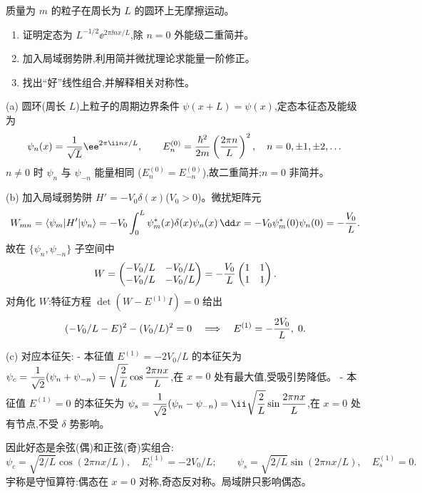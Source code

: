 \begin{question}
质量为 $m$ 的粒子在周长为 $L$ 的圆环上无摩擦运动。
\begin{enumerate}
\item 证明定态为 $L^{-1/2}\ee^{2\pi\ii nx/L}$,除 $n=0$ 外能级二重简并。
\item 加入局域弱势阱,利用简并微扰理论求能量一阶修正。
\item 找出“好”线性组合,并解释相关对称性。
\end{enumerate}
\begin{solution}
(a) 圆环(周长 $L$)上粒子的周期边界条件 $\psi(x+L)=\psi(x)$,定态本征态及能级为
\[
\psi_n(x)={1\over\sqrt L}\ee^{2\pi\ii nx/L},\qquad
E_n^{(0)}={\hbar^2\over2m}\left({2\pi n\over L}\right)^2,\quad n=0,\pm1,\pm2,\dots
\]
$n\ne0$ 时 $\psi_n$ 与 $\psi_{-n}$ 能量相同 ($E_n^{(0)}=E_{-n}^{(0)}$),故二重简并;$n=0$ 非简并。

(b) 加入局域弱势阱 $H'=-V_0\delta(x)$($V_0>0$)。微扰矩阵元
\[
W_{mn}=\langle\psi_m|H'|\psi_n\rangle
=-V_0\int_0^L\psi_m^*(x)\delta(x)\psi_n(x)\,\dd x
=-V_0\psi_m^*(0)\psi_n(0)=-{V_0\over L}.
\]
故在 $\{\psi_n,\psi_{-n}\}$ 子空间中
\[
W=\begin{pmatrix}
-V_0/L & -V_0/L\\
-V_0/L & -V_0/L
\end{pmatrix}
=-{V_0\over L}\begin{pmatrix}1&1\\1&1\end{pmatrix}.
\]
对角化 $W$:特征方程 $\det(W-E^{(1)}I)=0$ 给出
\[
(-V_0/L-E)^2-(V_0/L)^2=0
\quad\Longrightarrow\quad E^{(1)}=-{2V_0\over L},\;0.
\]

(c) 对应本征矢:
- 本征值 $E^{(1)}=-2V_0/L$ 的本征矢为 $\displaystyle\psi_c={1\over\sqrt2}(\psi_n+\psi_{-n})=\sqrt{2\over L}\cos{2\pi nx\over L}$,在 $x=0$ 处有最大值,受吸引势降低。
- 本征值 $E^{(1)}=0$ 的本征矢为 $\displaystyle\psi_s={1\over\sqrt2}(\psi_n-\psi_{-n})=\ii\sqrt{2\over L}\sin{2\pi nx\over L}$,在 $x=0$ 处有节点,不受 $\delta$ 势影响。

因此好态是余弦(偶)和正弦(奇)实组合:
\[
\boxed{\psi_c=\sqrt{2/L}\cos(2\pi nx/L),\quad E_c^{(1)}=-2V_0/L;}\qquad
\boxed{\psi_s=\sqrt{2/L}\sin(2\pi nx/L),\quad E_s^{(1)}=0.}
\]
宇称是守恒算符:偶态在 $x=0$ 对称,奇态反对称。局域阱只影响偶态。
\end{solution}
\end{question}

